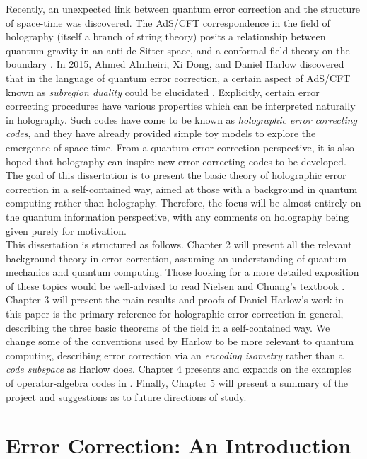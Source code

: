\documentclass[12pt,a4paper]{report}
\numberwithin{equation}{section}
\theoremstyle{definition}
\theoremstyle{theorem}
\theoremstyle{theorem}
\theoremstyle{example}
\theoremstyle{definition}
\begin{document}
Recently, an unexpected link between quantum error correction and the structure of space-time was discovered. The AdS/CFT correspondence in the field of holography (itself a branch of string theory) posits a relationship between quantum gravity in an anti-de Sitter space, and a conformal field theory on the boundary \cite{Maldacena}. In 2015, Ahmed Almheiri, Xi Dong, and Daniel Harlow discovered that in the language of quantum error correction, a certain aspect of AdS/CFT known as \textit{subregion duality} could be elucidated \cite{ADH}. Explicitly, certain error correcting procedures have various properties which can be interpreted naturally in holography. Such codes have come to be known as \textit{holographic error correcting codes}, and they have already provided simple toy models to explore the emergence of space-time. From a quantum error correction perspective, it is also hoped that holography can inspire new error correcting codes to be developed.\\
The goal of this dissertation is to present the basic theory of holographic error correction in a self-contained way, aimed at those with a background in quantum computing rather than holography. Therefore, the focus will be almost entirely on the quantum information perspective, with any comments on holography being given purely for motivation.\\
This dissertation is structured as follows. Chapter 2 will present all the relevant background theory in error correction, assuming an understanding of quantum mechanics and quantum computing. Those looking for a more detailed exposition of these topics would be well-advised to read Nielsen and Chuang's textbook \cite{NielsenChuang}. Chapter 3 will present the main results and proofs of Daniel Harlow's work in \cite{Harlow} - this paper is the primary reference for holographic error correction in general, describing the three basic theorems of the field in a self-contained way. We change some of the conventions used by Harlow to be more relevant to quantum computing, describing error correction via an \textit{encoding isometry} rather than a \textit{code subspace} as Harlow does. Chapter 4 presents and expands on the examples of operator-algebra codes in \cite{Pollack}. Finally, Chapter 5 will present a summary of the project and suggestions as to future directions of study.


\chapter{Error Correction: An Introduction}
\end{document}
